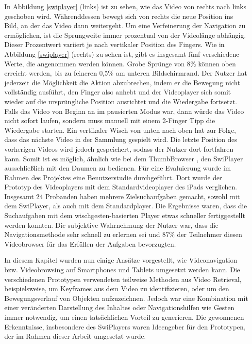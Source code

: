 \documentclass[11pt,a4paper]{report}
\begin{document}
In Abbildung \ref{swiplayer} (links) ist zu sehen, wie das Video von rechts nach links geschoben wird. Währenddessen bewegt sich von rechts die neue Position ins Bild, an der das Video dann weitergeht. Um eine Verfeinerung der Navigation zu ermöglichen, ist die Sprungweite immer prozentual von der Videolänge abhängig. Dieser Prozentwert variiert je nach vertikaler Position des Fingers. Wie in Abbildung \ref{swiplayer} (rechts) zu sehen ist, gibt es insgesamt fünf verschiedene Werte, die angenommen werden können. Grobe Sprünge von 8\% können oben erreicht werden, bis zu feineren 0,5\% am unteren Bildschirmrand. Der Nutzer hat jederzeit die Möglichkeit die Aktion abzubrechen, indem er die Bewegung nicht vollständig ausführt, den Finger also anhebt und der Videoplayer sich somit wieder auf die ursprüngliche Position ausrichtet und die Wiedergabe fortsetzt. Falls das Video von Beginn an im pausierten Modus war, dann würde das Video nicht sofort laufen, sondern muss manuell mit einem 2-Finger Tipp die Wiedergabe starten. Ein vertikaler Wisch von unten nach oben hat zur Folge, dass das nächste Video in der Sammlung gespielt wird. Die letzte Position des vorherigen Videos wird jedoch gespeichert, sodass der Nutzer dort fortfahren kann. Somit ist es möglich, ähnlich wie bei dem ThumbBrowser \cite{hudelist2013mobile}, den SwiPlayer ausschließlich mit den Daumen zu bedienen. Für eine Evaluierung wurde im Rahmen des Projektes eine Benutzerstudie durchgeführt. Dort wurde der Prototyp des Videoplayers mit dem Standardvideoplayer des iPads verglichen. Insgesamt 24 Probanden haben mehrere Zielsuchaufgaben gemacht, sowohl mit dem SwiPlayer, als auch mit dem Standardplayer. Die Ergebnisse waren, dass die Suchaufgaben mit dem wischgesten-basierten Player etwas schneller fertiggestellt werden konnten. Die subjektive Wahrnehmung der Nutzer war, dass die Navigationsmethode sehr schnell zu erlernen sei und 87\% der Teilnehmer diesen Videobrowser für das Erfüllen der Aufgaben bevorzugten.

In diesem Kapitel wurden nun einige Ansätze vorgestellt, wie Videonavigation bzw. Videobrowsing auf Smartphones und Tablets umgesetzt werden kann. Die verschiedenen Prototypen verwendeten teilweise Methoden aus Video Retrieval, beispielsweise, um Keyframes aus dem Video zu identifizieren, oder um den Bewegungsverlauf von Objekten aufzuzeichnen. Jedoch war eine Kombination mit einer veränderten Darstellung des Inhaltes oder Navigationshilfen wie Gesten immer notwendig, um einen tatsächlichen Vorteil zu generieren. Die gewonnenen Erkenntnisse, insbesondere des SwiPlayers waren Ideengeber für den Prototypen, der im Rahmen dieser Arbeit umgesetzt wurde.
\end{document}
